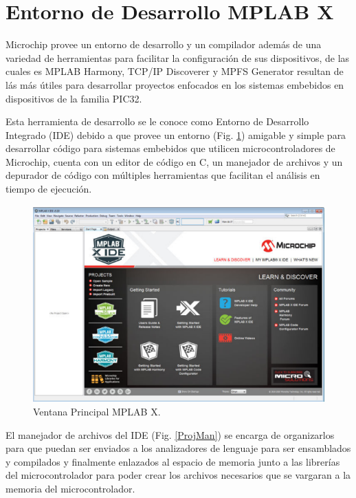 \documentclass[letterpaper,12pt,oneside]{book}
\begin{document}
		\section{Entorno de Desarrollo MPLAB X}
		Microchip provee un entorno de desarrollo y un compilador además de una variedad de herramientas para facilitar la configuración de sus dispositivos, de las cuales es MPLAB Harmony, TCP/IP Discoverer y MPFS Generator resultan de lás más útiles para desarrollar proyectos enfocados en los sistemas embebidos en dispositivos de la familia PIC32.

		Esta herramienta de desarrollo se le conoce como Entorno de Desarrollo Integrado (IDE) debido a que provee un entorno (Fig. \ref{Prin}) amigable y simple para desarrollar código para sistemas embebidos que utilicen microcontroladores de Microchip, cuenta con un editor de código en C, un manejador de archivos y un depurador de código con múltiples herramientas que facilitan el análisis en tiempo de ejecución.

		\begin{figure}[!hpb]
			\centering
			\includegraphics[scale = 0.8]{Material de Consulta/VentPrin.PNG}
			\caption[Ventana Principal]{Ventana Principal MPLAB X.}
			\label{Prin}
		\end{figure}

		El manejador de archivos del IDE (Fig. \ref{ProjMan}) se encarga de organizarlos para que puedan ser enviados a los analizadores de lenguaje para ser ensamblados y compilados y finalmente enlazados al espacio de memoria
		junto a las librerías del microcontrolador para poder crear los archivos necesarios que se vargaran a la memoria del microcontrolador. 
\end{document}
